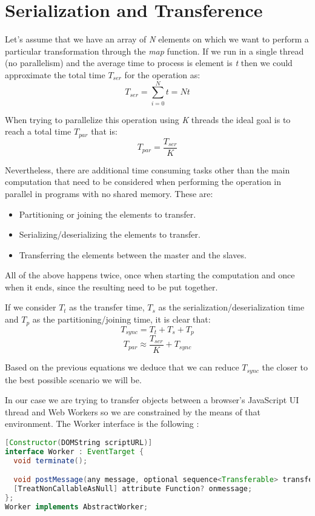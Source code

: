 \section{Serialization and Transference}

Let's assume that we have an array of \textit{N} elements on which we want to perform a particular transformation through the \textit{map} function. If we run in a single thread (no parallelism) and the average time to process is element is \textit{t} then we could approximate the total time \(T_{ser}\) for the operation as:
\[T_{ser} = \sum_{i = 0}^{N}t = Nt\]

When trying to parallelize this operation using \textit{K} threads the ideal goal is to reach a total time \(T_{par}\) that is:
\[T_{par} = \frac{T_{ser}}{K}\]

Nevertheless, there are additional time consuming tasks other than the main computation that need to be considered when performing the operation in parallel in programs with no shared memory. These are:
\begin{itemize}
  \item Partitioning or joining the elements to transfer.
  \item Serializing/deserializing the elements to transfer.
  \item Transferring the elements between the master and the slaves.
\end{itemize}

All of the above happens twice, once when starting the computation and once when it ends, since the resulting need to be put together.

If we consider \(T_{t}\) as the transfer time, \(T_{s}\) as the serialization/deserialization time and \(T_{p}\) as the partitioning/joining time, it is clear that:
\[T_{sync} = T_{t} + T_{s} + T_{p}\]
\[T_{par} \approx \frac{T_{ser}}{K} + T_{sync}\]

Based on the previous equations we deduce that we can reduce \(T_{sync}\) the closer to the best possible scenario we will be.

In our case we are trying to transfer objects between a browser's JavaScript UI thread and Web Workers so we are constrained by the means of that environment. The Worker interface is the following \cite{w3c-ww}:
\begin{lstlisting}[language=Java, caption=The Worker interface]
[Constructor(DOMString scriptURL)]
interface Worker : EventTarget {
  void terminate();

  void postMessage(any message, optional sequence<Transferable> transfer);
  [TreatNonCallableAsNull] attribute Function? onmessage;
};
Worker implements AbstractWorker;
\end{lstlisting}

